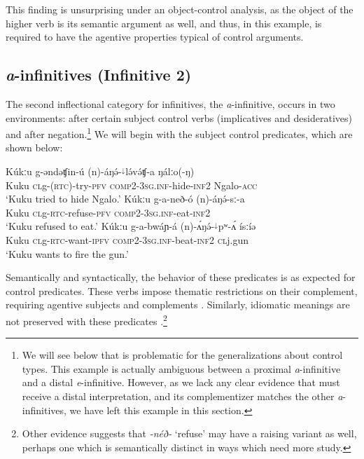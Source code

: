 This finding is unsurprising under an object-control analysis, as the object of the higher verb is its semantic argument as well, and thus, in this example, is required to have the agentive properties typical of control arguments.

\subsection{\textit{a}-infinitives (Infinitive 2)}

The second inflectional category for infinitives, the \textit{a}-infinitive, occurs in two environments: after certain subject control verbs (implicatives and desideratives) and after negation.\footnote{We will see below that  is problematic for the generalizations about control types. This example is actually ambiguous between a proximal \textit{a}-infinitive and a distal \textit{e}-infinitive. However, as we lack any clear evidence that  must receive a distal interpretation, and its complementizer matches the other \textit{a}-infinitives, we have left this example in this section.} We will begin with the subject control predicates, which are shown below:

	\ea	\gll 	Kúkːu  g-əndəʧin-ú        (n)-áŋə́-$^{↓}$lə́və́ʧ-{a}              ŋálːo(-ŋ) \\
          	Kuku  \textsc{cl}g-(\textsc{rtc})-try-\textsc{pfv}     \textsc{comp2-3sg.inf}-hide-\textsc{inf2}  Ngalo-\textsc{acc}\\
          	\glt ‘Kuku tried to hide Ngalo.'
	\ex	\gll  Kúkːu	g-a-neð-ó                  (n)-áŋə́-sː-{a}	\\	
		Kuku \textsc{cl}g-\textsc{rtc}-refuse-\textsc{pfv}   \textsc{comp2-3sg.inf}-eat-\textsc{inf2}\\
		\glt ‘Kuku refused to eat.’
	\ex	\gll	 Kúkːu g-a-bwáɲ-á (n)-ʌ́ŋə́-$^{↓}$pʷ-{ʌ́} ísːíə	 \\
		Kuku \textsc{cl}g-\textsc{rtc}-want-\textsc{ipfv}   \textsc{comp2-3sg.inf}-beat-\textsc{inf2} \textsc{cl}j.gun\\
		\glt ‘Kuku wants to fire the gun.’\label{ex:ch15:kukushoots}
\z 

Semantically and syntactically, the behavior of these predicates is as expected for control predicates.  These verbs impose thematic restrictions on their complement, requiring agentive subjects and complements . Similarly, idiomatic meanings are not preserved with these predicates .\footnote{Other evidence suggests that \textit{-néð-} `refuse' may have a raising variant as well, perhaps one which is semantically distinct in ways which need more study.}

